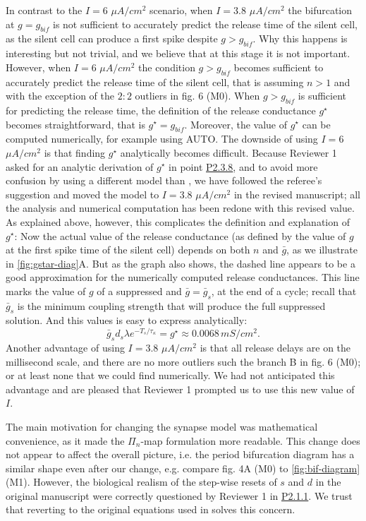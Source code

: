 \documentclass[utf8]{article}
\newcounter{point}[section]
\begin{document}
In contrast to the $I=6$ $\si{\mu A/cm^2}$ scenario, when $I=3.8$ $\si{\mu A/cm^2}$ the bifurcation at $g=g_{bif}$ is not sufficient to accurately predict the release time of the silent cell, as the silent cell can produce a first spike despite $g > g_{bif}$.
Why this happens is interesting but not trivial, and we believe that at this stage it is not important.
However, when $I=6$ $\si{\mu A/cm^2}$ the condition $g>g_{bif}$ becomes sufficient to accurately predict the release time of the silent cell, that is assuming $n>1$ and with the exception of the $2:2$ outliers in fig. 6 (M0).
When $g>g_{bif}$ is sufficient for predicting the release time, the definition of the release conductance $g^\star$ becomes straightforward, that is $g^\star=g_{bif}$.
Moreover, the value of $g^\star$ can be computed numerically, for example using AUTO.
The downside of using $I=6$ $\si{\mu A/cm^2}$ is that finding $g^\star$ analytically becomes difficult.
Because Reviewer 1 asked for an analytic derivation of $g^\star$ in point \hyperref[p:gstar]{P2.3.8}, and to avoid more confusion by using a different model than \cite{bose2011},
we have followed the referee's suggestion and moved the model to $I=3.8$ $\si{\mu A/cm^2}$ in the revised manuscript; all the analysis and numerical computation has been redone with this revised value.
As explained above, however, this complicates the definition and explanation of $g^\star$:
Now the actual value of the release conductance (as defined by the value of $g$ at the first spike time of the silent cell) depends on both $n$ and $\bar g$, as we illustrate in \cref{fig:gstar-diag}A.
But as the graph also shows, the dashed line appears to be a good approximation for the numerically computed release conductances.
This line marks the value of $g$ of a suppressed and $\bar g= \bar g_s$, at the end of a cycle; recall that $\bar g_{s}$ is the minimum coupling strength that will produce the full suppressed solution.
And this values is easy to express analytically:
\begin{equation*}
	\bar g_s d_s\lambda e^{-T_{s}/\tau_\kappa}=g^{\star} \approx 0.0068\, \si{mS/cm^2}.
\end{equation*}
Another advantage of using $I=3.8$ $\si{\mu A/cm^2}$ is that all release delays are on the millisecond scale, and there are no more outliers such the branch B in fig. 6 (M0); or at least none that we could find numerically.
We had not anticipated this advantage and are pleased that Reviewer 1 prompted us to use this new value of $I$.

The main motivation for changing the synapse model was mathematical convenience, as it made the $\Pi_{n}$-map formulation more readable.
This change does not appear to affect the overall picture, i.e. the period bifurcation diagram has a similar shape even after our change, e.g. compare fig. 4A (M0) to \cref{fig:bif-diagram} (M1).
However, the biological realism of the step-wise resets of $s$ and $d$ in the original manuscript were correctly questioned by Reviewer 1 in \hyperref[p:biol]{P2.1.1}.
We trust that reverting to the original equations used in \cite{bose2011} solves this concern.
\end{document}
